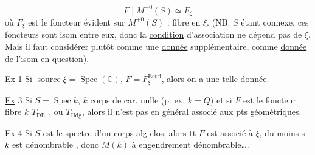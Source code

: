 \[
F\mid M^{+0}(S)\simeq F_\xi
\]
où $F_\xi$ est le foncteur évident sur $M^{+0}(S)$ : fibre en $\xi$. (NB. $S$ étant connexe, ces foncteurs sont isom entre eux, donc la \uline{condition} d'association ne dépend pas de $\xi$. Mais il faut  considérer plutôt comme une \uline{donnée} supplémentaire, comme \uline{donnée} de l'isom en question).

\uline{Ex 1} Si $\operatorname{source}\xi=\operatorname{Spec}(\mathbb C)$,  $F=F^{\mathrm{Betti}}_\xi$, alors on a une telle donnée. 

\uline{Ex} 3 Si $S=\operatorname{Spec}k$, $k$ corps de car. nulle (p. ex. $k=Q$) et si $F$ est le foncteur fibre  $k$ $T_{\mathrm{DR}}$ , ou $T_{\mathrm{Hdg}}$, alors il n'est pas en général associé aux pts géométriques.

\uline{Ex} 4 Si  $S$ est le spectre d'un corps alg clos, alors tt $F$ est associé à $\xi$, du moins si $k$ est dénombrable , donc $M(k)$ à engendrement dénombrable\ldots .


